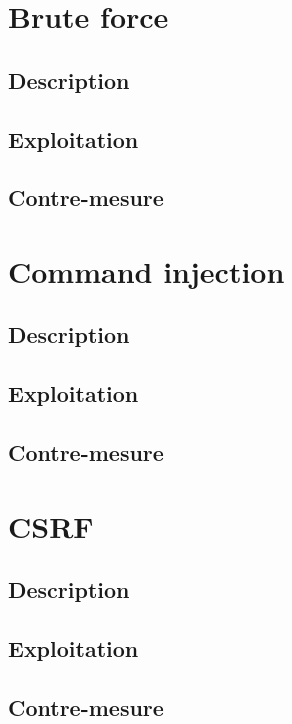 \newpage

\section{Brute force}

\subsection{Description}

\subsection{Exploitation}

\subsection{Contre-mesure}


\section{Command injection}

\subsection{Description}

\subsection{Exploitation}

\subsection{Contre-mesure}


\section{ CSRF}

\subsection{Description}

\subsection{Exploitation}

\subsection{Contre-mesure}






